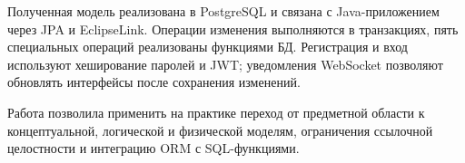 \documentclass[12pt,a4paper]{article}
\begin{document}
Полученная модель реализована в PostgreSQL и связана с Java-приложением через
JPA и EclipseLink. Операции изменения выполняются в транзакциях, пять
специальных операций реализованы функциями БД. Регистрация и вход используют
хеширование паролей и JWT; уведомления WebSocket позволяют обновлять интерфейсы
после сохранения изменений.

Работа позволила применить на практике переход от предметной области к
концептуальной, логической и физической моделям, ограничения ссылочной
целостности и интеграцию ORM с SQL-функциями.
\end{document}

